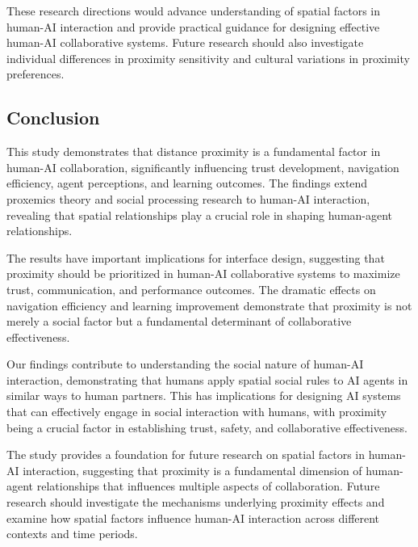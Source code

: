 \documentclass[12pt]{article}
\begin{document}
These research directions would advance understanding of spatial factors in human-AI interaction and provide practical guidance for designing effective human-AI collaborative systems. Future research should also investigate individual differences in proximity sensitivity and cultural variations in proximity preferences.

\subsection{Conclusion}

This study demonstrates that distance proximity is a fundamental factor in human-AI collaboration, significantly influencing trust development, navigation efficiency, agent perceptions, and learning outcomes. The findings extend proxemics theory and social processing research to human-AI interaction, revealing that spatial relationships play a crucial role in shaping human-agent relationships.

The results have important implications for interface design, suggesting that proximity should be prioritized in human-AI collaborative systems to maximize trust, communication, and performance outcomes. The dramatic effects on navigation efficiency and learning improvement demonstrate that proximity is not merely a social factor but a fundamental determinant of collaborative effectiveness.

Our findings contribute to understanding the social nature of human-AI interaction, demonstrating that humans apply spatial social rules to AI agents in similar ways to human partners. This has implications for designing AI systems that can effectively engage in social interaction with humans, with proximity being a crucial factor in establishing trust, safety, and collaborative effectiveness.

The study provides a foundation for future research on spatial factors in human-AI interaction, suggesting that proximity is a fundamental dimension of human-agent relationships that influences multiple aspects of collaboration. Future research should investigate the mechanisms underlying proximity effects and examine how spatial factors influence human-AI interaction across different contexts and time periods.



\end{document}
